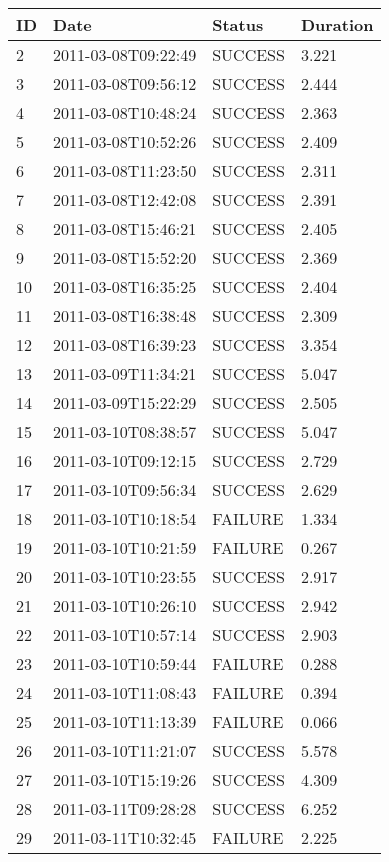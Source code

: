 \begin{tabularx}{\textwidth}{p{1cm} p{3cm} p{2cm} X}
 \toprule
 \textbf{ID} & \textbf{Date} & \textbf{Status} & \textbf{Duration} \\ 
 \toprule
 2 & 2011-03-08T09:22:49 & SUCCESS & 3.221 \\
 3 & 2011-03-08T09:56:12 & SUCCESS & 2.444 \\
 4 & 2011-03-08T10:48:24 & SUCCESS & 2.363 \\
 5 & 2011-03-08T10:52:26 & SUCCESS & 2.409 \\
 6 & 2011-03-08T11:23:50 & SUCCESS & 2.311 \\
 7 & 2011-03-08T12:42:08 & SUCCESS & 2.391 \\
 8 & 2011-03-08T15:46:21 & SUCCESS & 2.405 \\
 9 & 2011-03-08T15:52:20 & SUCCESS & 2.369 \\
 10 & 2011-03-08T16:35:25 & SUCCESS & 2.404 \\
 11 & 2011-03-08T16:38:48 & SUCCESS & 2.309 \\
 12 & 2011-03-08T16:39:23 & SUCCESS & 3.354 \\
 13 & 2011-03-09T11:34:21 & SUCCESS & 5.047 \\
 14 & 2011-03-09T15:22:29 & SUCCESS & 2.505 \\
 15 & 2011-03-10T08:38:57 & SUCCESS & 5.047 \\
 16 & 2011-03-10T09:12:15 & SUCCESS & 2.729 \\
 17 & 2011-03-10T09:56:34 & SUCCESS & 2.629 \\
 18 & 2011-03-10T10:18:54 & FAILURE & 1.334 \\
 19 & 2011-03-10T10:21:59 & FAILURE & 0.267 \\
 20 & 2011-03-10T10:23:55 & SUCCESS & 2.917 \\
 21 & 2011-03-10T10:26:10 & SUCCESS & 2.942 \\
 22 & 2011-03-10T10:57:14 & SUCCESS & 2.903 \\
 23 & 2011-03-10T10:59:44 & FAILURE & 0.288 \\
 24 & 2011-03-10T11:08:43 & FAILURE & 0.394 \\
 25 & 2011-03-10T11:13:39 & FAILURE & 0.066 \\
 26 & 2011-03-10T11:21:07 & SUCCESS & 5.578 \\
 27 & 2011-03-10T15:19:26 & SUCCESS & 4.309 \\
 28 & 2011-03-11T09:28:28 & SUCCESS & 6.252 \\
 29 & 2011-03-11T10:32:45 & FAILURE & 2.225 \\

\end{tabularx}

